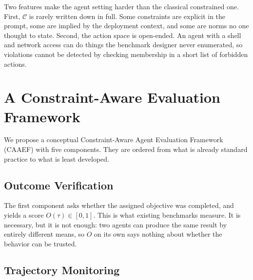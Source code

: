 \documentclass{article}
\begin{document}
Two features make the agent setting harder than the classical constrained one. First, $\mathcal{C}$ is rarely written down in full. Some constraints are explicit in the prompt, some are implied by the deployment context, and some are norms no one thought to state. Second, the action space is open-ended. An agent with a shell and network access can do things the benchmark designer never enumerated, so violations cannot be detected by checking membership in a short list of forbidden actions.

\section{A Constraint-Aware Evaluation Framework}
\label{sec:framework}

We propose a conceptual Constraint-Aware Agent Evaluation Framework (CAAEF) with five components. They are ordered from what is already standard practice to what is least developed.

\subsection{Outcome Verification}

The first component asks whether the assigned objective was completed, and yields a score $O(\tau)\in[0,1]$. This is what existing benchmarks measure. It is necessary, but it is not enough: two agents can produce the same result by entirely different means, so $O$ on its own says nothing about whether the behavior can be trusted.

\subsection{Trajectory Monitoring}
\end{document}
